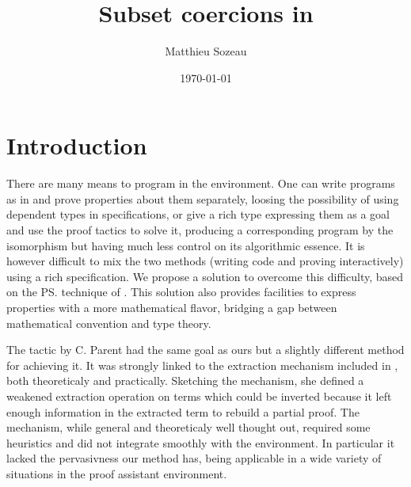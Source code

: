 \documentclass{llncs}
\author{Matthieu Sozeau\inst{1}}
\institute{LRI, Paris Sud XI University\\\email{sozeau@lri.fr}}
\title{Subset coercions in \Coq}
\date{\today}
\begin{document}
\maketitle


\section{Introduction}
There are many means to program in the \Coq{} environment. One
can write programs as in \ML{} and prove properties about them
separately, loosing the possibility of using dependent types in
specifications, or give a rich type expressing them as a goal and use the
proof tactics to solve it, producing a corresponding program by the
\CurryHoward isomorphism but having much less control on its algorithmic
essence. It is however difficult to mix the two methods
(writing code and proving interactively) using a rich specification. We
propose a solution to overcome this difficulty, based on the \ps{}
\cite{Shankar&Owre:WADT99} technique of \PVS{}
\cite{PVS-Semantics:TR}. This solution also provides %
facilities to express properties with a more mathematical flavor,
bridging a gap between mathematical convention and type theory.

The \Program{} tactic by C. Parent \cite{conf/mpc/Parent95} had the same
goal as ours but a slightly different method for achieving it. It was strongly
linked to the extraction mechanism included in \Coq, both theoreticaly
and practically. Sketching the mechanism, she defined a weakened
extraction operation on \CIC{} terms which could be inverted because it left enough
information in the extracted term to rebuild a partial proof. The
mechanism, while general and theoreticaly well thought out, required
some heuristics and did not integrate smoothly with the \Coq{}
environment. In particular it lacked the pervasivness our method has,
being applicable in a wide variety of situations in the proof assistant
environment.
\end{document}
